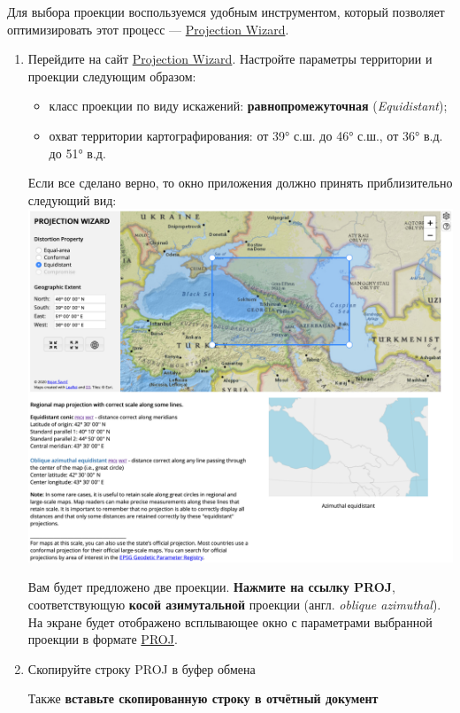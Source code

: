 \documentclass[
  12pt,
]{book}
\providecommand{\tightlist}{%
  \setlength{\itemsep}{0pt}\setlength{\parskip}{0pt}}
\begin{document}
Для выбора проекции воспользуемся удобным инструментом, который позволяет оптимизировать этот процесс --- \href{http://projectionwizard.org/}{Projection Wizard}.

\begin{enumerate}
\def\labelenumi{\arabic{enumi}.}
\item
  Перейдите на сайт \href{http://projectionwizard.org/}{Projection Wizard}. Настройте параметры территории и проекции следующим образом:

  \begin{itemize}
  \tightlist
  \item
    класс проекции по виду искажений: \textbf{равнопромежуточная} (\emph{Equidistant});
  \item
    охват территории картографирования: от 39° с.ш. до 46° с.ш., от 36° в.д. до 51° в.д.
  \end{itemize}

  Если все сделано верно, то окно приложения должно принять приблизительно следующий вид:
  \includegraphics{images/Ex01_MapGeneral/pwizard.png}

  Вам будет предложено две проекции. \textbf{Нажмите на ссылку PROJ}, соответствующую \textbf{косой азимутальной} проекции (англ. \emph{oblique azimuthal}). На экране будет отображено всплывающее окно с параметрами выбранной проекции в формате \href{https://proj.org/}{PROJ}.
\item
  Скопируйте строку PROJ в буфер обмена

  Также \textbf{вставьте скопированную строку в отчётный документ}


\end{enumerate}
\end{document}
